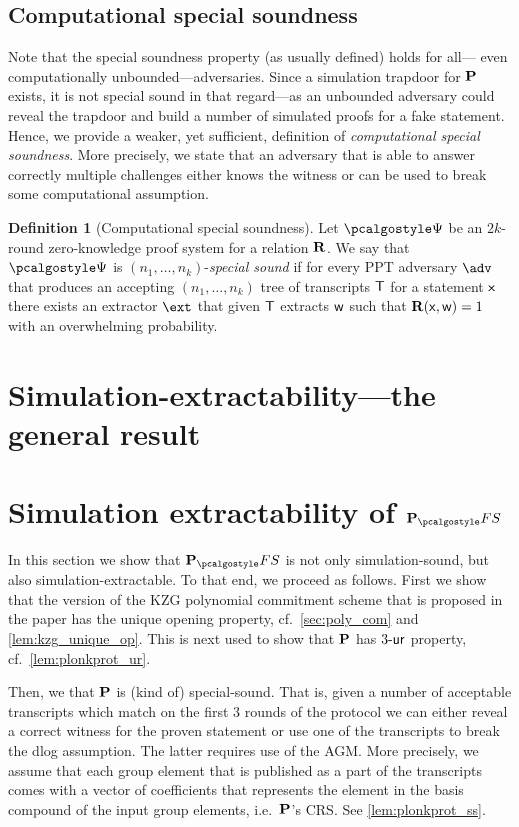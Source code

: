 \documentclass[runningheads,11pt]{llncs}
\theoremstyle{definition}
\newtheorem{definition}[theorem]{Definition}
\begin{document}
\subsection{Computational special soundness}
Note that the special soundness property (as usually defined) holds for all--- even computationally unbounded---adversaries. Since a simulation trapdoor for $\mathbf{P}$ exists, it is not special sound in that regard---as an unbounded adversary could reveal the trapdoor and build a number of simulated proofs for a fake statement. 
Hence, we provide a weaker, yet sufficient, definition of \emph{computational special soundness}. More precisely, we state that an adversary that is able to answer correctly multiple challenges either knows the witness or can be used to break some computational assumption. 

\begin{definition}[Computational special soundness]
	Let $\proofsystem$ be an $2k$-round zero-knowledge proof system for a relation $\mathbf{R}$. 
	We say that $\proofsystem$ is $(n_1, \ldots, n_k)$-\emph{special sound} if for every PPT adversary $\adv$ that produces an accepting $(n_1, \ldots, n_k)$ tree of transcripts $\mathsf{T}$ for a statement $\mathsf{x}$ there exists an extractor $\ext$ that given $\mathsf{T}$ extracts $\mathsf{w}$ such that $\mathbf{R}(\mathsf{x}, \mathsf{w}) = 1$ with an overwhelming probability.
\end{definition}

\section{Simulation-extractability---the general result}

\section{Simulation extractability of $\plonkprotfs$} 
In this section we show that $\plonkprotfs$
is not only simulation-sound, but also simulation-extractable. To that end, we
proceed as follows. 
First we show that the version of the KZG polynomial commitment scheme that is proposed in the \plonk{} paper has the unique opening property, cf.~\cref{sec:poly_com} and \cref{lem:kzg_unique_op}. This is next used to show that $\mathbf{P}$ has ${3\text{-}\mathsf{ur}}$ property, cf.~\cref{lem:plonkprot_ur}.

Then, we that 
$\mathbf{P}$ is (kind of) special-sound. That is, given a number of acceptable
transcripts which match on the first 3 rounds of the protocol we can either
reveal a correct witness for the proven statement or use one of the transcripts
to break the dlog assumption. The latter requires use of the AGM. More
precisely, we assume that each group element that is published as a part of the
transcripts comes with a vector of coefficients that represents the element in
the basis compound of the input group elements, i.e.~$\mathbf{P}$'s CRS. See \cref{lem:plonkprot_ss}.
\end{document}
